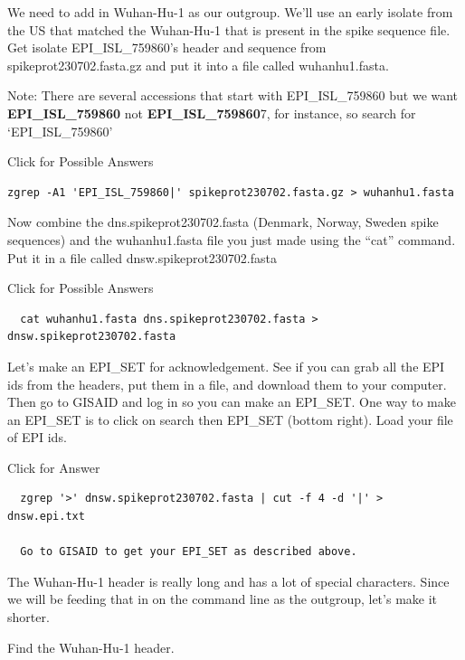 \documentclass[
]{book}
\begin{document}
\hfill\break

We need to add in Wuhan-Hu-1 as our outgroup. We'll use an early isolate from the US that matched the Wuhan-Hu-1 that is present in the spike sequence file. Get isolate EPI\_ISL\_759860's header and sequence from spikeprot230702.fasta.gz and put it into a file called wuhanhu1.fasta.

Note: There are several accessions that start with EPI\_ISL\_759860 but we want \textbf{EPI\_ISL\_759860} not \textbf{EPI\_ISL\_759860}7, for instance, so search for `EPI\_ISL\_759860\textbar{}'

Click for Possible Answers

\begin{verbatim}
zgrep -A1 'EPI_ISL_759860|' spikeprot230702.fasta.gz > wuhanhu1.fasta
\end{verbatim}

\hfill\break

Now combine the dns.spikeprot230702.fasta (Denmark, Norway, Sweden spike sequences) and the wuhanhu1.fasta file you just made using the ``cat'' command. Put it in a file called dnsw.spikeprot230702.fasta

Click for Possible Answers

\begin{verbatim}
  cat wuhanhu1.fasta dns.spikeprot230702.fasta > dnsw.spikeprot230702.fasta
\end{verbatim}

\hfill\break

Let's make an EPI\_SET for acknowledgement. See if you can grab all the EPI ids from the headers, put them in a file, and download them to your computer. Then go to GISAID and log in so you can make an EPI\_SET. One way to make an EPI\_SET is to click on search then EPI\_SET (bottom right). Load your file of EPI ids.

Click for Answer

\begin{verbatim}
  zgrep '>' dnsw.spikeprot230702.fasta | cut -f 4 -d '|' > dnsw.epi.txt
  
  Go to GISAID to get your EPI_SET as described above.
\end{verbatim}

\hfill\break

The Wuhan-Hu-1 header is really long and has a lot of special characters. Since we will be feeding that in on the command line as the outgroup, let's make it shorter.

Find the Wuhan-Hu-1 header.
\end{document}
